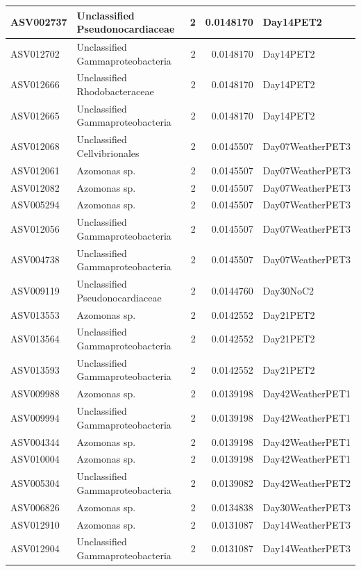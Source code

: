 \documentclass[
]{article}
\begin{document}
\begin{table}[H]
\begin{tabular}{l|l|r|r|l}
\hline
ASV002737 & Unclassified Pseudonocardiaceae & 2 & 0.0148170 & Day14PET2\\
\hline
ASV012702 & Unclassified Gammaproteobacteria & 2 & 0.0148170 & Day14PET2\\
\hline
ASV012666 & Unclassified Rhodobacteraceae & 2 & 0.0148170 & Day14PET2\\
\hline
ASV012665 & Unclassified Gammaproteobacteria & 2 & 0.0148170 & Day14PET2\\
\hline
ASV012068 & Unclassified Cellvibrionales & 2 & 0.0145507 & Day07WeatherPET3\\
\hline
ASV012061 & Azomonas sp. & 2 & 0.0145507 & Day07WeatherPET3\\
\hline
ASV012082 & Azomonas sp. & 2 & 0.0145507 & Day07WeatherPET3\\
\hline
ASV005294 & Azomonas sp. & 2 & 0.0145507 & Day07WeatherPET3\\
\hline
ASV012056 & Unclassified Gammaproteobacteria & 2 & 0.0145507 & Day07WeatherPET3\\
\hline
ASV004738 & Unclassified Gammaproteobacteria & 2 & 0.0145507 & Day07WeatherPET3\\
\hline
ASV009119 & Unclassified Pseudonocardiaceae & 2 & 0.0144760 & Day30NoC2\\
\hline
ASV013553 & Azomonas sp. & 2 & 0.0142552 & Day21PET2\\
\hline
ASV013564 & Unclassified Gammaproteobacteria & 2 & 0.0142552 & Day21PET2\\
\hline
ASV013593 & Unclassified Gammaproteobacteria & 2 & 0.0142552 & Day21PET2\\
\hline
ASV009988 & Azomonas sp. & 2 & 0.0139198 & Day42WeatherPET1\\
\hline
ASV009994 & Unclassified Gammaproteobacteria & 2 & 0.0139198 & Day42WeatherPET1\\
\hline
ASV004344 & Azomonas sp. & 2 & 0.0139198 & Day42WeatherPET1\\
\hline
ASV010004 & Azomonas sp. & 2 & 0.0139198 & Day42WeatherPET1\\
\hline
ASV005304 & Unclassified Gammaproteobacteria & 2 & 0.0139082 & Day42WeatherPET2\\
\hline
ASV006826 & Azomonas sp. & 2 & 0.0134838 & Day30WeatherPET3\\
\hline
ASV012910 & Azomonas sp. & 2 & 0.0131087 & Day14WeatherPET3\\
\hline
ASV012904 & Unclassified Gammaproteobacteria & 2 & 0.0131087 & Day14WeatherPET3\\
\hline

\end{tabular}
\end{table}
\end{document}
